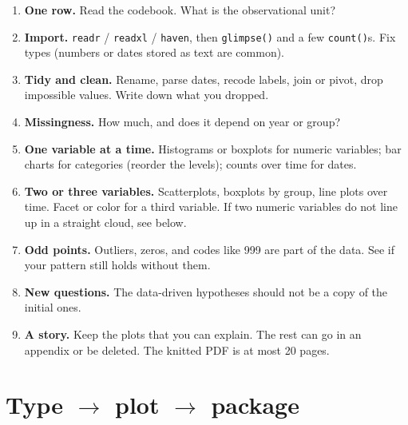 \documentclass[11pt, a4paper]{article}
\begin{document}
\begin{enumerate}
    \item \textbf{One row.} Read the codebook. What is the observational unit?
    \item \textbf{Import.} \texttt{readr} / \texttt{readxl} / \texttt{haven}, then \texttt{glimpse()} and a few \texttt{count()}s. Fix types (numbers or dates stored as text are common).
    \item \textbf{Tidy and clean.} Rename, parse dates, recode labels, join or pivot, drop impossible values. Write down what you dropped.
    \item \textbf{Missingness.} How much, and does it depend on year or group?
    \item \textbf{One variable at a time.} Histograms or boxplots for numeric variables; bar charts for categories (reorder the levels); counts over time for dates.
    \item \textbf{Two or three variables.} Scatterplots, boxplots by group, line plots over time. Facet or color for a third variable. If two numeric variables do not line up in a straight cloud, see below.
    \item \textbf{Odd points.} Outliers, zeros, and codes like 999 are part of the data. See if your pattern still holds without them.
    \item \textbf{New questions.} The data-driven hypotheses should not be a copy of the initial ones.
    \item \textbf{A story.} Keep the plots that you can explain. The rest can go in an appendix or be deleted. The knitted PDF is at most 20 pages.
\end{enumerate}

\section*{Type $\rightarrow$ plot $\rightarrow$ package}
\end{document}
